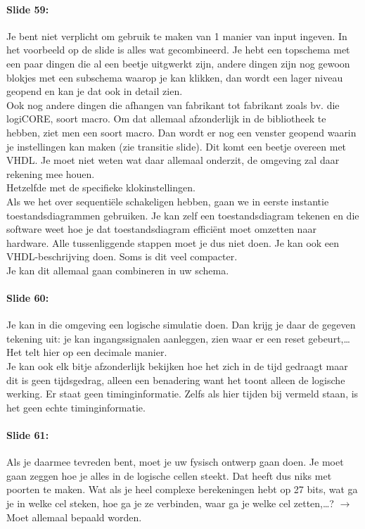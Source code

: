 \documentclass[10pt,a4paper]{book}
\begin{document}
\paragraph{Slide 59:} Je bent niet verplicht om gebruik te maken van 1 manier van input ingeven. In het voorbeeld op de slide is alles wat gecombineerd. Je hebt een topschema met een paar dingen die al een beetje uitgwerkt zijn, andere dingen zijn nog gewoon blokjes met een subschema waarop je kan klikken, dan wordt een lager niveau geopend en kan je dat ook in detail zien. \\
Ook nog andere dingen die afhangen van fabrikant tot fabrikant zoals bv. die logiCORE, soort macro.  Om dat allemaal afzonderlijk in de bibliotheek te hebben, ziet men een soort macro. Dan wordt er nog een venster geopend waarin je instellingen kan maken (zie transitie slide). Dit komt een beetje overeen met VHDL. Je moet niet weten wat daar allemaal onderzit, de omgeving zal daar rekening mee houen.\\
Hetzelfde met de specifieke klokinstellingen. \\
Als we het over sequenti\"ele schakeligen hebben, gaan we in eerste instantie toestandsdiagrammen gebruiken. Je kan zelf een toestandsdiagram tekenen en die software weet hoe je dat toestandsdiagram effici\"ent moet omzetten naar hardware. Alle tussenliggende stappen moet je dus niet doen. Je kan ook een VHDL-beschrijving doen. Soms is dit veel compacter.\\
Je kan dit allemaal gaan combineren in uw schema.

\paragraph{Slide 60:} Je kan in die omgeving een logische simulatie doen. Dan krijg je daar de gegeven tekening uit: je kan ingangssignalen aanleggen, zien waar er een reset gebeurt,\ldots Het telt hier op een decimale manier.\\
Je kan ook elk bitje afzonderlijk bekijken hoe het zich in de tijd gedraagt maar dit is geen tijdsgedrag, alleen een benadering want het toont alleen de logische werking. Er staat geen timinginformatie. Zelfs als hier tijden bij vermeld staan, is het geen echte timinginformatie.

\paragraph{Slide 61:} Als je daarmee tevreden bent, moet je uw fysisch ontwerp gaan doen. Je moet gaan zeggen hoe je alles in de logische cellen steekt. Dat heeft dus niks met poorten te maken. Wat als je heel complexe berekeningen hebt op 27 bits, wat ga je in welke cel steken, hoe ga je ze verbinden, waar ga je welke cel zetten,\ldots ? $\rightarrow$ Moet allemaal bepaald worden.
\end{document}
